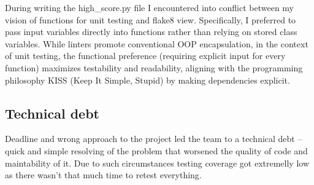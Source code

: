 \documentclass{article}
\begin{document}
During writing the high\_score.py file I encountered into conflict between my vision of functions for unit testing and flake8 view. Specifically, I preferred to pass input variables directly into functions rather than relying on stored class variables. While linters promote conventional OOP encapsulation, in the context of unit testing, the functional preference (requiring explicit input for every function) maximizes testability and readability, aligning with the programming philosophy KISS (Keep It Simple, Stupid) by making dependencies explicit.


\subsection{Technical debt}
Deadline and wrong approach to the project led the team to a technical debt -- quick and simple resolving of the problem that worsened the quality of code and maintability of it. Due to such circumstances testing coverage got extremelly low as there wasn't that much time to retest everything. 







\end{document}

